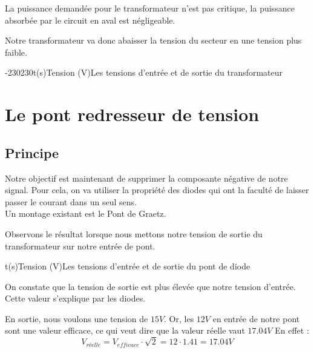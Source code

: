   La puissance demandée pour le transformateur n'est pas critique, la puissance absorbée par le circuit en aval est négligeable.

  Notre transformateur va donc abaisser la tension du secteur en une tension plus faible.

  \begin{graphicFigure}{0.6}{0.6}{0}{0.08}{-230}{230}{t(s)}{Tension (V)}{Les tensions d'entrée et de sortie du transformateur}
    \end{graphicFigure}

    \newpage 
  \section{Le pont redresseur de tension}

  \subsection{Principe}
  Notre objectif est maintenant de supprimer la composante négative de notre signal. Pour cela, on va utiliser la propriété des diodes qui ont la faculté de laisser passer le courant dans un seul sens.\\
  Un montage existant est le Pont de Graetz.


  Observons le résultat lorsque nous mettons notre tension de sortie du transformateur sur notre entrée de pont.

  \begin{graphicFigure}{0.6}{0.6}{0}{0.08}{-20}{20}{t(s)}{Tension (V)}{Les tensions d'entrée et de sortie du pont de diode}
    \end{graphicFigure}

  On constate que la tension de sortie est plus élevée que notre tension d'entrée.\\
  Cette valeur s'explique par les diodes. 
  
  En sortie, nous voulons une tension de $15V$. Or, les $12V$ en entrée de notre pont sont une valeur efficace, ce qui veut dire que la valeur réelle vaut $17.04V$
    En effet : 
  $$V_{réelle} = V_{efficace}\cdot \sqrt{2} = 12\cdot 1.41 = 17.04 V$$


